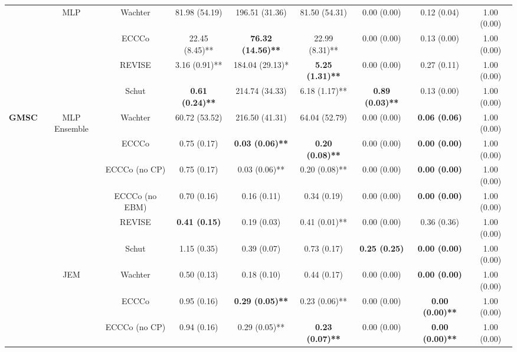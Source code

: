 \begin{table}
{\begin{tabular}[t]{>{}c|c|c|c|c|c|c|c|c}
 & \multirow{-4}{*}{\centering\arraybackslash MLP} & Wachter & 81.98 (54.19) & 196.51 (31.36) & 81.50 (54.31) & 0.00 (0.00) & 0.12 (0.04) & 1.00 (0.00)\\
\cline{2-9}
 &  & ECCCo & 22.45 (8.45)** & \textbf{76.32 (14.56)**} & 22.99 (8.31)** & 0.00 (0.00) & 0.13 (0.00) & 1.00 (0.00)\\

 &  & REVISE & 3.16 (0.91)** & 184.04 (29.13)* & \textbf{5.25 (1.31)**} & 0.00 (0.00) & 0.27 (0.11) & 1.00 (0.00)\\

 &  & Schut & \textbf{0.61 (0.24)**} & 214.74 (34.33) & 6.18 (1.17)** & \textbf{0.89 (0.03)**} & 0.13 (0.00) & 1.00 (0.00)\\

\multirow{-16}{*}{\centering\arraybackslash \textbf{GMSC}} & \multirow{-4}{*}{\centering\arraybackslash MLP Ensemble} & Wachter & 60.72 (53.52) & 216.50 (41.31) & 64.04 (52.79) & 0.00 (0.00) & \textbf{0.06 (0.06)} & 1.00 (0.00)\\
\cline{1-9}
 &  & ECCCo & 0.75 (0.17) & \textbf{0.03 (0.06)**} & \textbf{0.20 (0.08)**} & 0.00 (0.00) & \textbf{0.00 (0.00)} & 1.00 (0.00)\\

 &  & ECCCo (no CP) & 0.75 (0.17) & 0.03 (0.06)** & 0.20 (0.08)** & 0.00 (0.00) & \textbf{0.00 (0.00)} & 1.00 (0.00)\\

 &  & ECCCo (no EBM) & 0.70 (0.16) & 0.16 (0.11) & 0.34 (0.19) & 0.00 (0.00) & \textbf{0.00 (0.00)} & 1.00 (0.00)\\

 &  & REVISE & \textbf{0.41 (0.15)} & 0.19 (0.03) & 0.41 (0.01)** & 0.00 (0.00) & 0.36 (0.36) & 1.00 (0.00)\\

 &  & Schut & 1.15 (0.35) & 0.39 (0.07) & 0.73 (0.17) & \textbf{0.25 (0.25)} & \textbf{0.00 (0.00)} & 1.00 (0.00)\\

 & \multirow{-6}{*}{\centering\arraybackslash JEM} & Wachter & 0.50 (0.13) & 0.18 (0.10) & 0.44 (0.17) & 0.00 (0.00) & \textbf{0.00 (0.00)} & 1.00 (0.00)\\
\cline{2-9}
 &  & ECCCo & 0.95 (0.16) & \textbf{0.29 (0.05)**} & 0.23 (0.06)** & 0.00 (0.00) & \textbf{0.00 (0.00)**} & 1.00 (0.00)\\

 &  & ECCCo (no CP) & 0.94 (0.16) & 0.29 (0.05)** & \textbf{0.23 (0.07)**} & 0.00 (0.00) & \textbf{0.00 (0.00)**} & 1.00 (0.00)\\


\end{tabular}}
\end{table}
